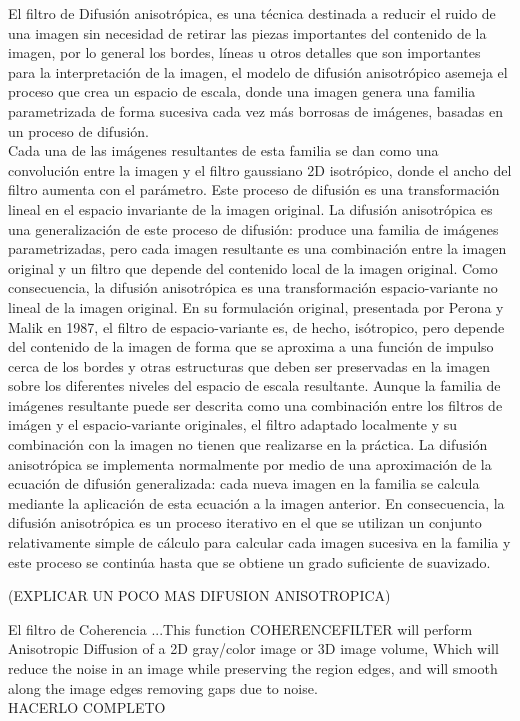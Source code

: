 El filtro de Difusi\'on anisotr\'opica, es una técnica destinada a reducir el ruido de una imagen sin necesidad de retirar las piezas importantes del contenido de la imagen, por lo general los bordes, líneas u otros detalles que son importantes para la interpretación de la imagen, el modelo de difusión anisotrópico asemeja el proceso que crea un espacio de escala, donde una imagen genera una familia parametrizada de forma sucesiva cada vez más borrosas de imágenes, basadas en un proceso de difusión.\\ 
Cada una de las im\'agenes resultantes de esta familia se dan como una convoluci\'on entre la imagen y el filtro gaussiano 2D isotr\'opico, donde el ancho del filtro aumenta con el par\'ametro. Este proceso de difusi\'on es una transformación lineal en el espacio invariante de la imagen original. La difusi\'on anisotr\'opica es una generalizaci\'on de este proceso de difusi\'on: produce una familia de im\'agenes parametrizadas, pero cada imagen resultante es una combinaci\'on entre la imagen original y un filtro que depende del contenido local de la imagen original. Como consecuencia, la difusi\'on anisotr\'opica es una transformaci\'on espacio-variante no lineal de la imagen original.
En su formulaci\'on original, presentada por Perona y Malik en 1987, el filtro de espacio-variante es, de hecho, is\'otropico, pero depende del contenido de la imagen de forma que se aproxima a una funci\'on de impulso cerca de los bordes y otras estructuras que deben ser preservadas en la imagen sobre los diferentes niveles del espacio de escala resultante.
Aunque la familia de im\'agenes resultante puede ser descrita como una combinaci\'on entre los filtros de im\'agen y el espacio-variante originales, el filtro adaptado localmente y su combinaci\'on con la imagen no tienen que realizarse en la pr\'actica. La difusi\'on anisotr\'opica se implementa normalmente por medio de una aproximaci\'on de la ecuaci\'on de difusi\'on generalizada: cada nueva imagen en la familia se calcula mediante la aplicaci\'on de esta ecuaci\'on a la imagen anterior. En consecuencia, la difusi\'on anisotr\'opica es un proceso iterativo en el que se utilizan un conjunto relativamente simple de c\'alculo para calcular cada imagen sucesiva en la familia y este proceso se contin\'ua hasta que se obtiene un grado suficiente de suavizado.

(EXPLICAR UN POCO MAS DIFUSION ANISOTROPICA)


El filtro de Coherencia ...This function COHERENCEFILTER will perform Anisotropic Diffusion of a 2D gray/color image or 3D image volume, Which will reduce the noise in an image while preserving the region edges, and will smooth along
the image edges removing gaps due to noise.\\ HACERLO COMPLETO 



